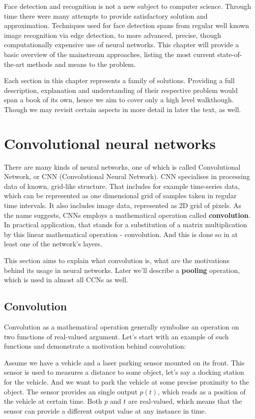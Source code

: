 Face detection and recognition is not a new subject to computer science. Through time there were many attempts to provide satisfactory solution and approximation. Techniques used for face detection spans from regular well known image recognition via edge detection, to more advanced, precise, though computationally expensive use of neural networks. This chapter will provide a basic overview of the mainstream approaches, listing the most current state-of-the-art methods and means to the problem.

Each section in this chapter represents a family of solutions. Providing a full description, explanation and understanding of their respective problem would span a book of its own, hence we aim to cover only a high level walkthough. Though we may revisit certain aspects in more detail in later the text, as well.

\section{Convolutional neural networks}

There are many kinds of neural networks, one of which is called Convolutional Network, or CNN (Convolutional Neural Network). CNN specialises in processing data of known, grid-like structure. That includes for example time-series data, which can be represented as one dimensional grid of samples taken in regular time intervals. It also includes image data, represented as 2D grid of pixels. As the name suggests, CNNs employs a mathematical operation called \textbf{convolution}. In practical application, that stands for a substitution of a matrix multiplication by this linear mathematical operation - convolution. And this is done so in at least one of the network's layers.

This section aims to explain what convolution is, what are the motivations behind its usage in neural networks. Later we'll describe a \textbf{pooling} operation, which is used in almost all CCNs as well.

\subsection{Convolution}

Convolution as a mathematical operation generally symbolise an operation on two functions of real-valued argument. Let's start with an example of such functions and demonstrate a motivation behind convolution:

Assume we have a vehicle and a laser parking sensor mounted on its front. This sensor is used to measures a distance to some object, let's say a docking station for the vehicle. And we want to park the vehicle at some precise proximity to the object. The sensor provides an single output $p(t)$, which reads as a position of the vehicle at certain time. Both $p$ and $t$ are real-valued, which means that the sensor can provide a different output value at any instance in time.

